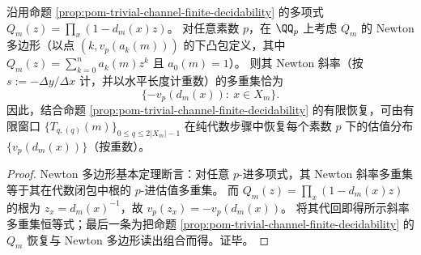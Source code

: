 \begin{proposition}\label{prop:pom-trivial-channel-padic-newton-polygon-valuations}
沿用命题 \ref{prop:pom-trivial-channel-finite-decidability} 的多项式 \(Q_m(z)=\prod_x(1-d_m(x)z)\)。
对任意素数 \(p\)，在 \(\QQ_p\) 上考虑 \(Q_m\) 的 Newton 多边形（以点 \((k,v_p(a_k(m)))\) 的下凸包定义，其中 \(Q_m(z)=\sum_{k=0}^{n}a_k(m)z^k\) 且 \(a_0(m)=1\)）。
则其 Newton 斜率（按 \(s:=-\Delta y/\Delta x\) 计，并以水平长度计重数）的多重集恰为
\[
\{-v_p(d_m(x)):\ x\in X_m\}.
\]
因此，结合命题 \ref{prop:pom-trivial-channel-finite-decidability} 的有限恢复，可由有限窗口
\(
\{T_{q,(q)}(m)\}_{0\le q\le 2|X_m|-1}
\)
在纯代数步骤中恢复每个素数 \(p\) 下的估值分布 \(\{v_p(d_m(x))\}\)（按重数）。
\end{proposition}
\begin{proof}
Newton 多边形基本定理断言：对任意 \(p\)-进多项式，其 Newton 斜率多重集等于其在代数闭包中根的 \(p\)-进估值多重集。
而 \(Q_m(z)=\prod_x(1-d_m(x)z)\) 的根为 \(z_x=d_m(x)^{-1}\)，故 \(v_p(z_x)=-v_p(d_m(x))\)。
将其代回即得所示斜率多重集恒等式；最后一条为把命题 \ref{prop:pom-trivial-channel-finite-decidability} 的 \(Q_m\) 恢复与 Newton 多边形读出组合而得。证毕。
\end{proof}

